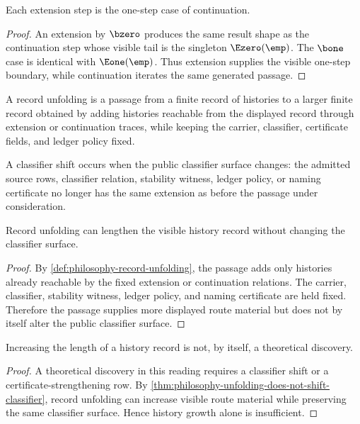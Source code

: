 \begin{theorem}
\label{thm:philosophy-extension-singleton-continuation}
Each extension step is the one-step case of continuation.
\end{theorem}
\begin{proof}
An extension by $\bzero$ produces the same result shape as the
continuation step whose visible tail is the singleton $\Ezero(\emp)$.
The $\bone$ case is identical with $\Eone(\emp)$. Thus extension
supplies the visible one-step boundary, while continuation iterates the
same generated passage.
\end{proof}

\begin{definition}
\label{def:philosophy-record-unfolding}
A record unfolding is a passage from a finite record of histories to a
larger finite record obtained by adding histories reachable from the
displayed record through extension or continuation traces, while keeping
the carrier, classifier, certificate fields, and ledger policy fixed.
\end{definition}

\begin{definition}
\label{def:philosophy-classifier-shift}
A classifier shift occurs when the public classifier surface changes:
the admitted source rows, classifier relation, stability witness, ledger
policy, or naming certificate no longer has the same extension as before
the passage under consideration.
\end{definition}

\begin{theorem}
\label{thm:philosophy-unfolding-does-not-shift-classifier}
Record unfolding can lengthen the visible history record without
changing the classifier surface.
\end{theorem}
\begin{proof}
By \autoref{def:philosophy-record-unfolding}, the passage adds only
histories already reachable by the fixed extension or continuation
relations. The carrier, classifier, stability witness, ledger policy,
and naming certificate are held fixed. Therefore the passage supplies
more displayed route material but does not by itself alter the public
classifier surface.
\end{proof}

\begin{corollary}
\label{cor:philosophy-history-growth-not-discovery}
Increasing the length of a history record is not, by itself, a
theoretical discovery.
\end{corollary}
\begin{proof}
A theoretical discovery in this reading requires a classifier shift or a
certificate-strengthening row. By
\autoref{thm:philosophy-unfolding-does-not-shift-classifier}, record
unfolding can increase visible route material while preserving the same
classifier surface. Hence history growth alone is insufficient.
\end{proof}

